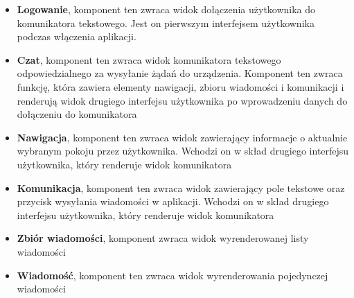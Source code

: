 \begin{itemize}  
	\item \textbf{ Logowanie}, komponent ten zwraca widok dołączenia użytkownika do komunikatora tekstowego. Jest on pierwszym interfejsem użytkownika podczas włączenia aplikacji.
	\\
	\item \textbf{ Czat}, komponent ten zwraca widok komunikatora tekstowego odpowiedzialnego za wysyłanie żądań do urządzenia. Komponent ten zwraca funkcję, która zawiera elementy nawigacji, zbioru wiadomości i komunikacji i renderują widok drugiego interfejsu użytkownika po wprowadzeniu danych do dołączeniu do komunikatora
	\\
\item \textbf{ Nawigacja}, komponent ten zwraca widok zawierający informacje o aktualnie wybranym pokoju przez użytkownika. Wchodzi on w skład drugiego interfejsu użytkownika, który renderuje widok komunikatora
	\\
\item \textbf{ Komunikacja}, komponent ten zwraca widok zawierający pole tekstowe oraz przycisk wysyłania wiadomości w aplikacji. Wchodzi on w skład drugiego interfejsu użytkownika, który renderuje widok komunikatora
	\\
\item \textbf{ Zbiór wiadomości}, komponent zwraca widok wyrenderowanej listy wiadomości
	\\
\item \textbf{ Wiadomość}, komponent ten zwraca widok wyrenderowania pojedynczej wiadomości
	\\
\end{itemize}


